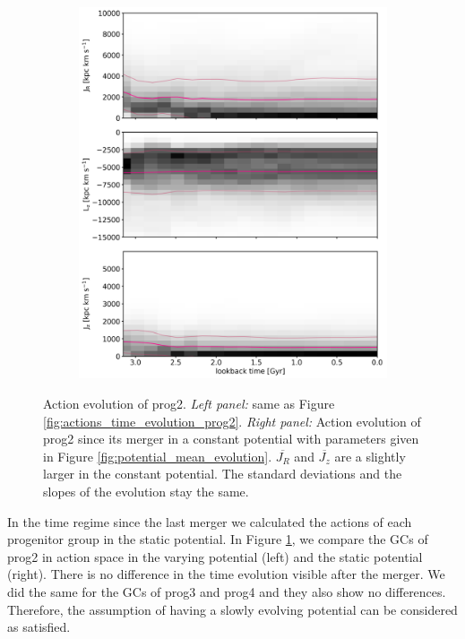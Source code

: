\begin{figure}[htbp]
\begin{subfigure}[c]{0.48\textwidth}
	    \includegraphics[width=\textwidth]{plots/Dynamics/prog2/action_wodisk_time_evolution_hist_mean_static_pot.png}
    \end{subfigure}
    \caption{Action evolution of prog2. \textit{Left panel:} same as Figure \ref{fig:actions_time_evolution_prog2}. \textit{Right panel:} Action evolution of prog2 since its merger in a constant potential with parameters given in Figure \ref{fig:potential_mean_evolution}. $\overline{J_R}$ and $\overline{J_z}$ are a slightly larger in the constant potential. The standard deviations and the slopes of the evolution stay the same.}\label{fig:comparison_actions_time_evolution_mean_pot_prog2}
\end{figure}
In the time regime since the last merger we calculated the actions of each progenitor group in the static potential. In Figure \ref{fig:comparison_actions_time_evolution_mean_pot_prog2}, we compare the \acp{GC} of prog2 in action space in the varying potential (left) and the static potential (right). There is no difference in the time evolution visible after the merger. We did the same for the \acp{GC} of prog3 and prog4 and they also show no differences. Therefore, the assumption of having a slowly evolving potential can be considered as satisfied.
